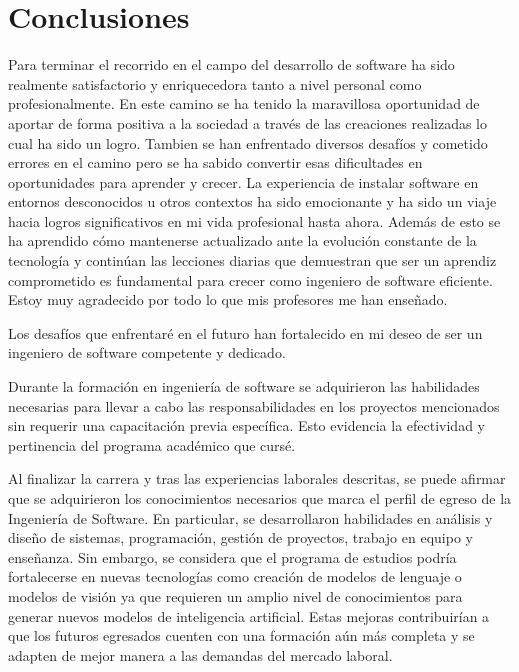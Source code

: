 \documentclass[protocolo.tex]{subfiles}
\begin{document}
\section{Conclusiones}
Para terminar el recorrido en el campo del desarrollo de software ha sido realmente
 satisfactorio y enriquecedora tanto a nivel personal como profesionalmente. 
En este camino se ha tenido la maravillosa oportunidad de aportar de forma 
positiva a la sociedad a través de las creaciones realizadas lo cual ha sido un logro.
Tambien se han enfrentado diversos desafíos y cometido errores en el camino pero se ha sabido convertir esas dificultades
en oportunidades para aprender y crecer. La experiencia de instalar software en entornos desconocidos u otros contextos ha sido 
emocionante y ha sido un viaje hacia logros significativos en mi vida profesional hasta ahora. Además de esto se ha aprendido cómo mantenerse actualizado ante la evolución constante de la tecnología y continúan las lecciones diarias que demuestran que ser un aprendiz comprometido es fundamental para crecer como ingeniero de software eficiente.
Estoy muy agradecido por todo lo que mis profesores me han enseñado.

Los desafíos que enfrentaré en el futuro han fortalecido en mi deseo de ser un ingeniero de software competente y dedicado.

Durante la formación en ingeniería de software se adquirieron las habilidades necesarias para llevar a cabo las responsabilidades en los proyectos mencionados sin requerir una capacitación previa específica. Esto evidencia la efectividad y pertinencia del programa académico que cursé.

Al finalizar la carrera y tras las experiencias laborales descritas, se puede afirmar que se  adquirieron los conocimientos necesarios que marca el perfil de egreso de la Ingeniería de Software. En particular, 
se desarrollaron habilidades en análisis y diseño de sistemas, programación, gestión de proyectos, trabajo en equipo y enseñanza. Sin embargo, se considera que el programa de estudios podría fortalecerse en nuevas tecnologías como creación de modelos de lenguaje o modelos de visión ya que requieren un amplio nivel de conocimientos para generar nuevos modelos de inteligencia artificial.  Estas mejoras contribuirían a que los futuros egresados cuenten con una formación aún más completa y se adapten de mejor manera a las demandas del mercado laboral.
\end{document}
